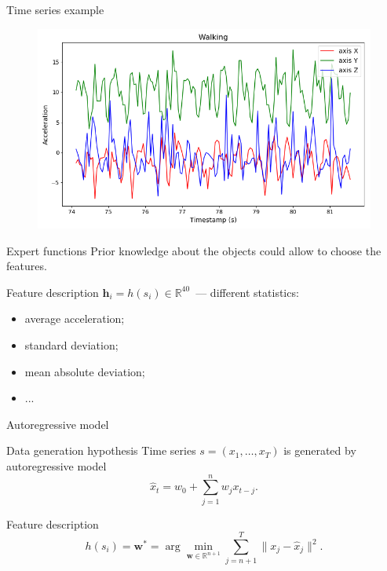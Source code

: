 \documentclass{beamer}
\begin{document}
\begin{frame}{Time series example}
	\begin{figure}[h]
		\centering
		\includegraphics[width=1\linewidth]{ts_example.png}
		\label{ts_example}
	\end{figure}
\end{frame}
\begin{frame}{Expert functions}
	Prior knowledge about the objects could allow to choose the features.
	\begin{block}{Feature description}
		$\mathbf{h}_i = h(s_i)\in \mathbb{R}^{40}$~--- different statistics:
		\begin{itemize}
			\item average acceleration;
			\item standard deviation;
			\item mean absolute deviation;
			\item ...
		\end{itemize}
	\end{block}

\end{frame}
\begin{frame}{Autoregressive model}
	\begin{block}{Data generation hypothesis}
		Time series $s = (x_1, \dots, x_T)$ is generated by autoregressive model
		\[
			\hat{x}_t = w_0 + \sum_{j=1}^n w_j x_{t-j}.
		\]
	\end{block}
	
	\begin{block}{Feature description}
		\[
			h(s_i) = \mathbf{w}^* = \arg \min_{\mathbf{w} \in \mathbb{R}^{n+1}} \sum_{j=n+1}^{T} \| x_j - \hat{x}_j \|^2.
		\]
	\end{block}
\end{frame}
\end{document}
